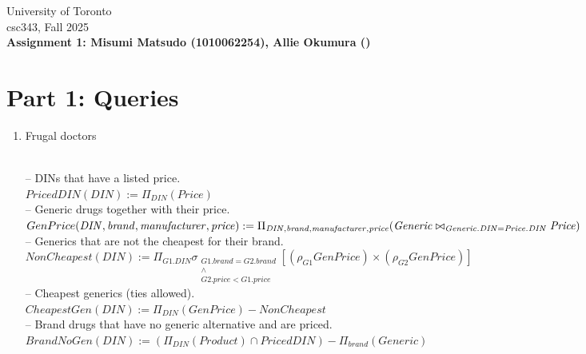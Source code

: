 \documentclass{article}
\newcommand{\var}[1]{\mathit{#1}}
\begin{document}
\vspace{-2.0cm}

\noindent
University of Toronto\\
{\sc csc}343, Fall 2025\\[10pt]
{\LARGE\bf Assignment 1: Misumi Matsudo (1010062254), Allie Okumura ()}

\section*{Part 1: Queries}

\begin{enumerate}

\item {\large Frugal doctors}

{~}\\
{\large
-- DINs that have a listed price. \\[5pt]
$
PricedDIN(\var{DIN}) :=
  \Pi_{\var{DIN}}(\var{Price})
$ \\[10pt]

-- Generic drugs together with their price. \\[5pt]
$
GenPrice(\var{DIN}, \var{brand}, \var{manufacturer}, \var{price}) \\
  := \Pi_{\var{DIN}, \var{brand}, \var{manufacturer}, \var{price}}
  (\var{Generic} \bowtie_{\var{Generic.DIN} = \var{Price.DIN}} \var{Price})
$ \\[10pt]

-- Generics that are not the cheapest for their brand. \\[5pt]
$
NonCheapest(\var{DIN}) :=
  \Pi_{G1.\var{DIN}}
  \sigma_{\substack{
    G1.\var{brand} = G2.\var{brand} \\
    \wedge \\
    G2.\var{price} < G1.\var{price}
  }}
  [ (\rho_{G1}GenPrice) \times (\rho_{G2}GenPrice) ]
$ \\[10pt]

-- Cheapest generics (ties allowed). \\[5pt]
$
CheapestGen(\var{DIN}) :=
  \Pi_{\var{DIN}}(GenPrice) - NonCheapest
$ \\[10pt]

-- Brand drugs that have no generic alternative and are priced. \\[5pt]
$
BrandNoGen(\var{DIN}) :=
  (\Pi_{\var{DIN}}(\var{Product}) \cap PricedDIN)
  -
  \Pi_{\var{brand}}(\var{Generic})
$ \\[10pt]

}
\end{enumerate}
\end{document}

